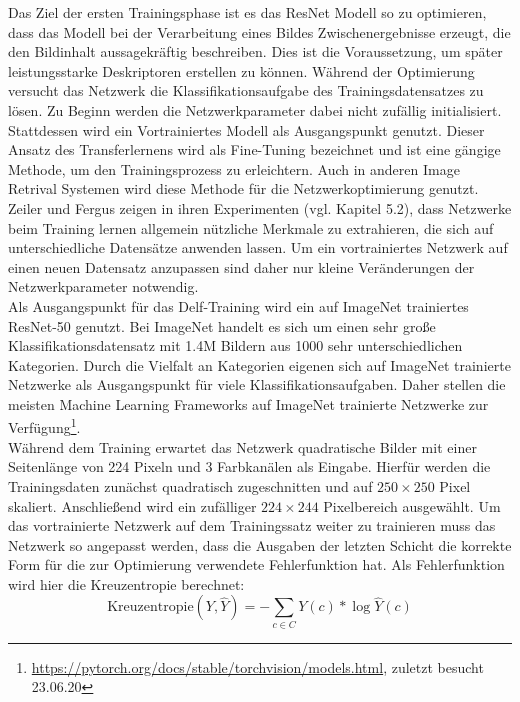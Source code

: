 Das Ziel der ersten Trainingsphase ist es das ResNet Modell so zu optimieren, dass das Modell bei der Verarbeitung eines Bildes Zwischenergebnisse erzeugt, die den Bildinhalt aussagekräftig beschreiben. Dies ist die Voraussetzung, um später leistungsstarke Deskriptoren erstellen zu können. Während der Optimierung versucht das Netzwerk die Klassifikationsaufgabe des Trainingsdatensatzes zu lösen. Zu Beginn werden die Netzwerkparameter dabei nicht zufällig initialisiert. Stattdessen wird ein Vortrainiertes Modell als Ausgangspunkt genutzt. Dieser Ansatz des Transferlernens wird als Fine-Tuning bezeichnet und ist eine gängige Methode, um den Trainingsprozess zu erleichtern. Auch in anderen Image Retrival Systemen \cite{convnet} \cite{siamac_contrastive_loss} wird diese Methode für die Netzwerkoptimierung genutzt. Zeiler und Fergus zeigen in ihren Experimenten (vgl. \cite{extraction_point_meaning} Kapitel 5.2), dass Netzwerke beim Training lernen allgemein nützliche Merkmale zu extrahieren, die sich auf unterschiedliche Datensätze anwenden lassen. Um ein vortrainiertes Netzwerk auf einen neuen Datensatz anzupassen sind daher nur kleine Veränderungen der Netzwerkparameter notwendig.
\\
Als Ausgangspunkt für das Delf-Training wird ein auf ImageNet trainiertes ResNet-50 genutzt. Bei ImageNet handelt es sich um einen sehr große Klassifikationsdatensatz mit 1.4M Bildern aus 1000 sehr unterschiedlichen Kategorien. Durch die Vielfalt an Kategorien eigenen sich auf ImageNet trainierte Netzwerke als Ausgangspunkt für viele Klassifikationsaufgaben. Daher stellen die meisten Machine Learning Frameworks auf ImageNet trainierte Netzwerke zur Verfügung\footnote{\url{https://pytorch.org/docs/stable/torchvision/models.html}, zuletzt besucht 23.06.20}. 
\\
Während dem Training erwartet das Netzwerk quadratische Bilder mit einer Seitenlänge von 224 Pixeln und 3 Farbkanälen als Eingabe. Hierfür werden die Trainingsdaten zunächst quadratisch zugeschnitten und auf $250\times250$ Pixel skaliert. Anschließend wird ein zufälliger $224\times244$ Pixelbereich ausgewählt.
Um das vortrainierte Netzwerk auf dem Trainingssatz weiter zu trainieren muss das Netzwerk so angepasst werden, dass die Ausgaben der letzten Schicht die korrekte Form für die zur Optimierung verwendete Fehlerfunktion hat. Als Fehlerfunktion wird hier die Kreuzentropie berechnet:
\begin{equation}
\text{Kreuzentropie}(Y,\hat{Y}) = -\sum_{c \in C}{Y(c)*\log\hat{Y}(c)}
\end{equation}
